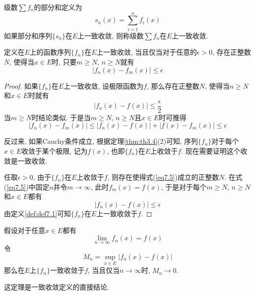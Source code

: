 \documentclass[cn,12pt,math=mtpro2,citestyle=gb7714-2015,bibstyle=gb7714-2015,twocol]{elegantbook}
\newcommand{\limn }{\lim_{n\to\infty}}
\begin{document}
\begin{definition}
级数$\sum f_n$的部分和定义为
$$s_n(x)=\sum_{i=1}^{n}f_i(x)$$
如果部分和序列$\{s_n\}$在$E$上一致收敛, 则称级数$\sum f_n$在$E$上一致收敛.
\end{definition}
\begin{theorem}[Cauchy准则]\label{thm:th7.5}
  定义在$E$上的函数序列$\{f_n\}$在$E$上一致收敛, 当且仅当对于任意的$\epsilon>0$, 存在正整数$N$, 使得当$x\in E$时, 只要$m\geq N$, $n\geq N$就有
  \begin{equation}\label{eq7.5}
    |f_n(x)-f_m(x)|\leq\epsilon
  \end{equation}
\end{theorem}
\begin{proof}
  如果$\{f_n\}$在$E$上一致收敛, 设极限函数为$f$, 那么存在正整数$N$, 使得当$n\geq N$和$x\in E$时就有
  $$|f_n(x)-f(x)|\leq\frac{\epsilon}{2}$$
  当$m\geq N$时结论类似. 于是当$m\geq N$, $n\geq N$且$x\in E$时可推得
  $$|f_n(x)-f_m(x)|\leq |f_n(x)-f(x)|+|f(x)-f_m(x)|\leq\epsilon$$

  反过来, 如果Cauchy条件成立, 根据定理\ref{thm:th3.4}(2)可知, 序列$\{f_n\}$对于每个$x\in E$收敛于某个极限, 记为$f(x)$, 也即$\{f_n\}$在$E$上收敛于$f$. 现在需要证明这个收敛是一致收敛.

  任取$\epsilon>0$, 由于$\{f_n\}$在$E$上收敛于$f$, 则存在使得式(\ref{eq7.5})成立的正整数$N$. 在式(\ref{eq7.5})中固定$n$并令$m\to\infty$, 此时$f_m(x)=f(x)$, 于是对于每个$m\geq N$, $n\geq N$和$x\in E$都有
  $$|f_n(x)-f(x)|\leq\epsilon$$
  由定义\ref{def:def7.1}可知$\{f_n\}$在$E$上一致收敛于$f$.

\end{proof}
\begin{theorem}\label{thm:th7.1}
  假设对于任意$x\in E$都有
  $$\limn f_n(x)=f(x)$$
  令
  $$M_n=\sup_{x\in E}|f_n(x)-f(x)|$$
  那么在$E$上$\{f_n\}$一致收敛于$f$, 当且仅当$n\to\infty$时, $M_n\to0$.
\end{theorem}
这定理是一致收敛定义的直接结论.
\end{document}
